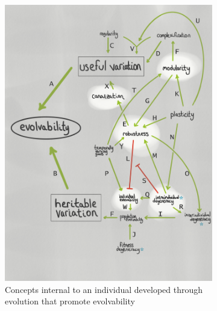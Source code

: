 \begin{figure}
\begin{subfigure}[b]{0.45\textwidth}
    	\includegraphics[width=\textwidth]{img/mindmap_indicators}
        \caption{Concepts internal to an individual developed through evolution that promote evolvability}
        \label{subfig:mindmap_indicators}
    \end{subfigure}%
    \hfill
    \begin{subfigure}[b]{0.45\textwidth}
        \centering

\end{subfigure}
\end{figure}

